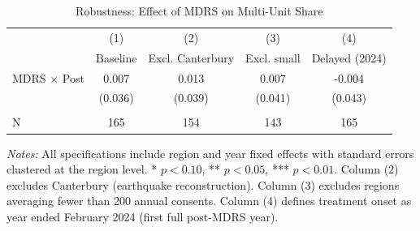 \begin{table}[H]
\centering
\caption{Robustness: Effect of MDRS on Multi-Unit Share}
\label{tab:robustness}
\begin{threeparttable}
\begin{tabular}{lcccc}
\toprule
 & (1) & (2) & (3) & (4) \\
 & Baseline & Excl. Canterbury & Excl. small & Delayed (2024) \\
\midrule
MDRS $\times$ Post & 0.007 & 0.013 & 0.007 & -0.004 \\
 & (0.036) & (0.039) & (0.041) & (0.043) \\
\\
N & 165 & 154 & 143 & 165 \\
\bottomrule
\end{tabular}
\begin{tablenotes}[flushleft]
\small
\item \textit{Notes:} All specifications include region and year fixed effects with standard errors clustered at the region level. * $p<0.10$, ** $p<0.05$, *** $p<0.01$. Column (2) excludes Canterbury (earthquake reconstruction). Column (3) excludes regions averaging fewer than 200 annual consents. Column (4) defines treatment onset as year ended February 2024 (first full post-MDRS year).
\end{tablenotes}
\end{threeparttable}
\end{table}
